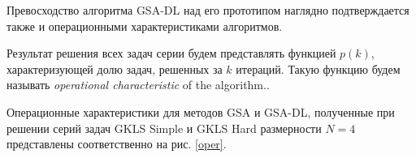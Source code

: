 \documentclass[runningheads]{llncs}
\begin{document}


Превосходство алгоритма GSA-DL над его прототипом наглядно подтверждается также и операционными характеристиками алгоритмов.  


Результат решения всех задач серии будем представлять функцией $p(k)$, характеризующей долю задач, решенных за $k$ итераций. Такую функцию будем называть \textit{operational characteristic} of the algorithm..

Операционные характеристики для методов GSA и GSA-DL, полученные при решении серий задач GKLS Simple и GKLS Hard размерности $N=4$ представлены соответственно на рис. \ref{oper}.
\end{document}
